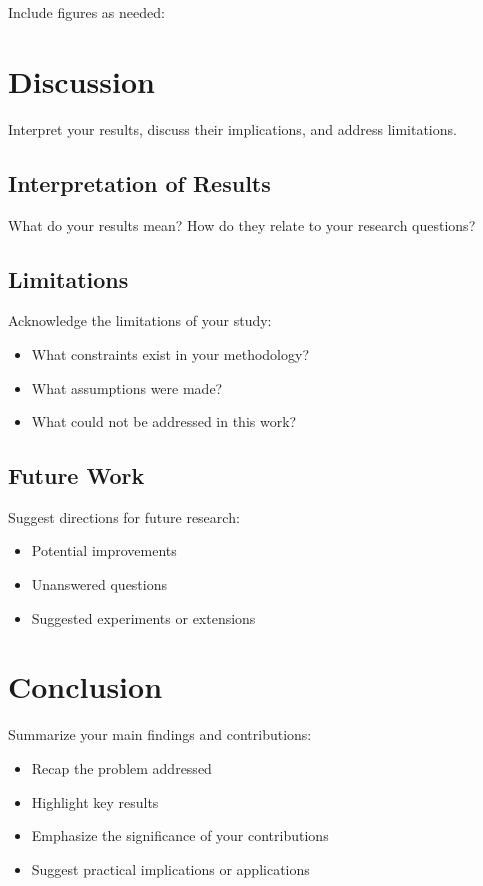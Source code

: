 \documentclass[11pt,a4paper]{article}
\theoremstyle{definition}
\begin{document}
Include figures as needed:

\section{Discussion}

Interpret your results, discuss their implications, and address limitations.

\subsection{Interpretation of Results}

What do your results mean? How do they relate to your research questions?

\subsection{Limitations}

Acknowledge the limitations of your study:
\begin{itemize}
    \item What constraints exist in your methodology?
    \item What assumptions were made?
    \item What could not be addressed in this work?
\end{itemize}

\subsection{Future Work}

Suggest directions for future research:
\begin{itemize}
    \item Potential improvements
    \item Unanswered questions
    \item Suggested experiments or extensions
\end{itemize}

\section{Conclusion}

Summarize your main findings and contributions:
\begin{itemize}
    \item Recap the problem addressed
    \item Highlight key results
    \item Emphasize the significance of your contributions
    \item Suggest practical implications or applications
\end{itemize}
\end{document}
